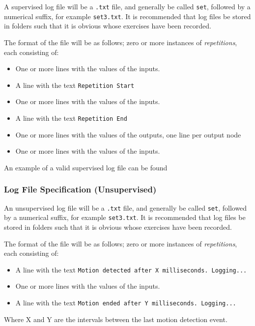 \documentclass[a4paper]{article}
\begin{document}
A supervised log file will be a \lstinline{.txt} file, and generally be called \lstinline{set}, followed by a numerical suffix, for example \lstinline{set3.txt}. It is recommended that log files be stored in folders such that it is obvious whose exercises have been recorded.

The format of the file will be as follows; zero or more instances of \emph{repetitions}, each consisting of:

\begin{itemize}
\item One or more lines with the values of the inputs.
\item A line with the text \lstinline{Repetition Start}
\item One or more lines with the values of the inputs.
\item A line with the text \lstinline{Repetition End}
\item One or more lines with the values of the outputs, one line per output node
\item One or more lines with the values of the inputs.
\end{itemize}

An example of a valid supervised log file can be found 

\subsubsection{Log File Specification (Unsupervised)}

An unsupervised log file will be a \lstinline{.txt} file, and generally be called \lstinline{set}, followed by a numerical suffix, for example \lstinline{set3.txt}. It is recommended that log files be stored in folders such that it is obvious whose exercises have been recorded.

The format of the file will be as follows; zero or more instances of \emph{repetitions}, each consisting of:

\begin{itemize}
\item A line with the text \lstinline{Motion detected after X milliseconds. Logging...}
\item One or more lines with the values of the inputs.
\item A line with the text \lstinline{Motion ended after Y milliseconds. Logging...}
\end{itemize}

Where X and Y are the intervals between the last motion detection event.
\end{document}
